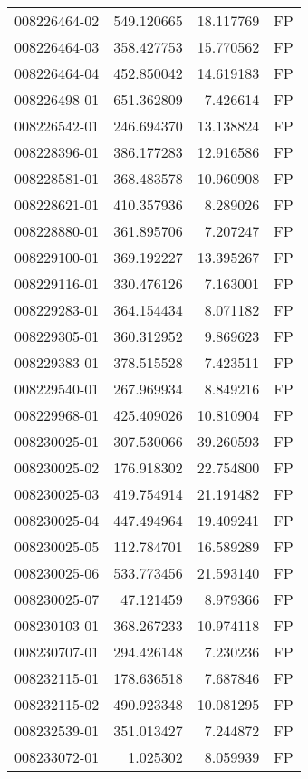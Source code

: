\begin{tabular}{lrrl}
008226464-02 &  549.120665 &    18.117769 &   FP \\
008226464-03 &  358.427753 &    15.770562 &   FP \\
008226464-04 &  452.850042 &    14.619183 &   FP \\
008226498-01 &  651.362809 &     7.426614 &   FP \\
008226542-01 &  246.694370 &    13.138824 &   FP \\
008228396-01 &  386.177283 &    12.916586 &   FP \\
008228581-01 &  368.483578 &    10.960908 &   FP \\
008228621-01 &  410.357936 &     8.289026 &   FP \\
008228880-01 &  361.895706 &     7.207247 &   FP \\
008229100-01 &  369.192227 &    13.395267 &   FP \\
008229116-01 &  330.476126 &     7.163001 &   FP \\
008229283-01 &  364.154434 &     8.071182 &   FP \\
008229305-01 &  360.312952 &     9.869623 &   FP \\
008229383-01 &  378.515528 &     7.423511 &   FP \\
008229540-01 &  267.969934 &     8.849216 &   FP \\
008229968-01 &  425.409026 &    10.810904 &   FP \\
008230025-01 &  307.530066 &    39.260593 &   FP \\
008230025-02 &  176.918302 &    22.754800 &   FP \\
008230025-03 &  419.754914 &    21.191482 &   FP \\
008230025-04 &  447.494964 &    19.409241 &   FP \\
008230025-05 &  112.784701 &    16.589289 &   FP \\
008230025-06 &  533.773456 &    21.593140 &   FP \\
008230025-07 &   47.121459 &     8.979366 &   FP \\
008230103-01 &  368.267233 &    10.974118 &   FP \\
008230707-01 &  294.426148 &     7.230236 &   FP \\
008232115-01 &  178.636518 &     7.687846 &   FP \\
008232115-02 &  490.923348 &    10.081295 &   FP \\
008232539-01 &  351.013427 &     7.244872 &   FP \\
008233072-01 &    1.025302 &     8.059939 &   FP \\

\end{tabular}
